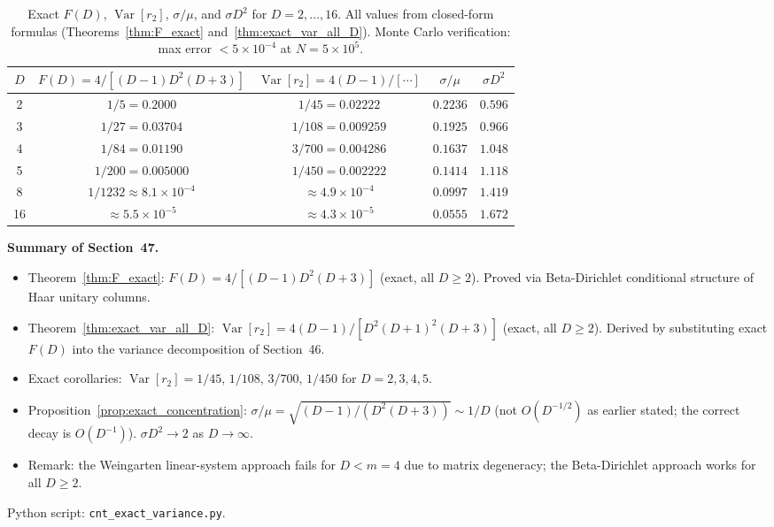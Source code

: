 \documentclass[12pt,a4paper]{article}
\begin{document}
\begin{table}[h!]
\centering
\caption{Exact $F(D)$, $\operatorname{Var}[r_2]$, $\sigma/\mu$, and $\sigma D^2$ for $D=2,\ldots,16$.
All values from closed-form formulas (Theorems~\ref{thm:F_exact} and~\ref{thm:exact_var_all_D}).
Monte Carlo verification: max error $<5\times10^{-4}$ at $N=5\times10^5$.}
\label{tab:exact_var_all_D}
\begin{tabular}{c|c|c|c|c}
$D$ & $F(D)=4/[(D-1)D^2(D+3)]$ & $\operatorname{Var}[r_2]=4(D-1)/[\cdots]$ & $\sigma/\mu$ & $\sigma D^2$ \\
\hline
2 & $1/5=0.2000$ & $1/45=0.02222$ & $0.2236$ & $0.596$ \\
3 & $1/27=0.03704$ & $1/108=0.009259$ & $0.1925$ & $0.966$ \\
4 & $1/84=0.01190$ & $3/700=0.004286$ & $0.1637$ & $1.048$ \\
5 & $1/200=0.005000$ & $1/450=0.002222$ & $0.1414$ & $1.118$ \\
8 & $1/1232\approx 8.1\times10^{-4}$ & $\approx4.9\times10^{-4}$ & $0.0997$ & $1.419$ \\
16 & $\approx5.5\times10^{-5}$ & $\approx4.3\times10^{-5}$ & $0.0555$ & $1.672$ \\
\end{tabular}
\end{table}

\noindent\textbf{Summary of Section~47.}
\begin{itemize}
\item Theorem~\ref{thm:F_exact}: $F(D)=4/[(D-1)D^2(D+3)]$ (exact, all $D\geq2$).
  Proved via Beta-Dirichlet conditional structure of Haar unitary columns.
\item Theorem~\ref{thm:exact_var_all_D}: $\operatorname{Var}[r_2]=4(D-1)/[D^2(D+1)^2(D+3)]$ (exact, all $D\geq2$).
  Derived by substituting exact $F(D)$ into the variance decomposition of Section~46.
\item Exact corollaries: $\operatorname{Var}[r_2]=1/45,\,1/108,\,3/700,\,1/450$ for $D=2,3,4,5$.
\item Proposition~\ref{prop:exact_concentration}: $\sigma/\mu=\sqrt{(D-1)/(D^2(D+3))}\sim1/D$
  (not $O(D^{-1/2})$ as earlier stated; the correct decay is $O(D^{-1})$).
  $\sigma D^2\to2$ as $D\to\infty$.
\item Remark: the Weingarten linear-system approach fails for $D<m=4$
  due to matrix degeneracy; the Beta-Dirichlet approach works for all $D\geq2$.
\end{itemize}
Python script: \texttt{cnt\_exact\_variance.py}.
\end{document}
